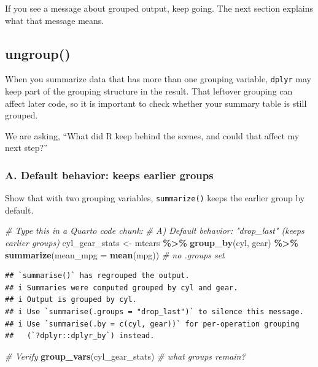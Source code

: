 \documentclass[
]{article}
\newenvironment{Shaded}{\begin{snugshade}}{\end{snugshade}}
\newcommand{\AttributeTok}[1]{\textcolor[rgb]{0.13,0.29,0.53}{#1}}
\newcommand{\CommentTok}[1]{\textcolor[rgb]{0.56,0.35,0.01}{\textit{#1}}}
\newcommand{\FunctionTok}[1]{\textcolor[rgb]{0.13,0.29,0.53}{\textbf{#1}}}
\newcommand{\NormalTok}[1]{#1}
\newcommand{\OtherTok}[1]{\textcolor[rgb]{0.56,0.35,0.01}{#1}}
\newcommand{\SpecialCharTok}[1]{\textcolor[rgb]{0.81,0.36,0.00}{\textbf{#1}}}
\begin{document}
If you see a message about grouped output, keep going. The next section
explains what that message means.

\subsection{ungroup()}\label{ungroup}

When you summarize data that has more than one grouping variable,
\texttt{dplyr} may keep part of the grouping structure in the result.
That leftover grouping can affect later code, so it is important to
check whether your summary table is still grouped.

We are asking, ``What did R keep behind the scenes, and could that
affect my next step?''

\subsubsection{A. Default behavior: keeps earlier
groups}\label{a.-default-behavior-keeps-earlier-groups}

Show that with two grouping variables, \texttt{summarize()} keeps the
earlier group by default.

\begin{Shaded}
\begin{Highlighting}[]
\CommentTok{\#  Type this in a Quarto code chunk:}
\CommentTok{\# A) Default behavior: "drop\_last" (keeps earlier groups)}
\NormalTok{cyl\_gear\_stats }\OtherTok{\textless{}{-}}\NormalTok{ mtcars }\SpecialCharTok{\%\textgreater{}\%}
  \FunctionTok{group\_by}\NormalTok{(cyl, gear) }\SpecialCharTok{\%\textgreater{}\%}
  \FunctionTok{summarize}\NormalTok{(}\AttributeTok{mean\_mpg =} \FunctionTok{mean}\NormalTok{(mpg))   }\CommentTok{\# no .groups set}
\end{Highlighting}
\end{Shaded}

\begin{verbatim}
## `summarise()` has regrouped the output.
## i Summaries were computed grouped by cyl and gear.
## i Output is grouped by cyl.
## i Use `summarise(.groups = "drop_last")` to silence this message.
## i Use `summarise(.by = c(cyl, gear))` for per-operation grouping
##   (`?dplyr::dplyr_by`) instead.
\end{verbatim}

\begin{Shaded}
\begin{Highlighting}[]
\CommentTok{\#   Verify}
\FunctionTok{group\_vars}\NormalTok{(cyl\_gear\_stats)  }\CommentTok{\# what groups remain?}
\end{Highlighting}
\end{Shaded}
\end{document}
